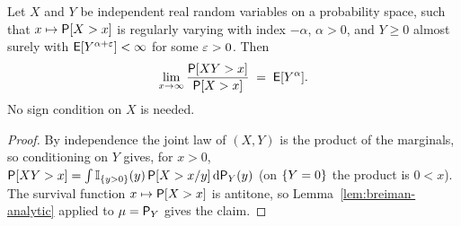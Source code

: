 \begin{theorem}
  \label{thm:breiman}
  \leanok
  Let $X$ and $Y$ be independent real random variables on a probability space, such that
  $x \mapsto \mathsf{P}[X > x]$ is regularly varying with index $-\alpha$, $\alpha > 0$, and
  $Y \ge 0$ almost surely with $\mathsf{E}[Y^{\alpha + \varepsilon}] < \infty$ for some $\varepsilon > 0$. Then
  \begin{align*}
    \lim_{x \to \infty} \frac{\mathsf{P}[X Y > x]}{\mathsf{P}[X > x]} \; = \; \mathsf{E}[Y^\alpha] .
  \end{align*}
  No sign condition on $X$ is needed.
\end{theorem}
\begin{proof}
  \leanok
  By independence the joint law of $(X, Y)$ is the product of the marginals, so
  conditioning on $Y$ gives, for $x > 0$,
  $\mathsf{P}[X Y > x] = \int \mathbb{I}_{{\left\{ y > 0 \right\}}}(y) \, \mathsf{P}[X > x / y] \, \mathrm{d} \mathsf{P}_Y(y)$
  (on $\left\{ Y = 0 \right\}$ the product is $0 < x$). The survival function $x \mapsto \mathsf{P}[X > x]$
  is antitone, so Lemma~\ref{lem:breiman-analytic} applied to $\mu = \mathsf{P}_Y$ gives the claim.
\end{proof}

